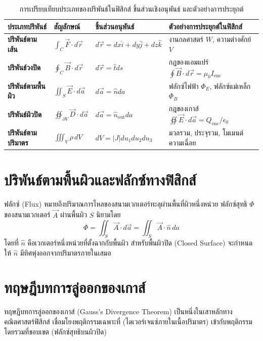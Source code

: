 \begin{table}[htbp]
    \centering
    \caption{การเปรียบเทียบประเภทของปริพันธ์ในฟิสิกส์ ชิ้นส่วนเชิงอนุพันธ์ และตัวอย่างการประยุกต์}
    \label{tab:integral_types_physics}
    \begin{tabularx}{\textwidth}{p{3.0cm}p{2.2cm}p{3.8cm}Y}
        \toprule
        \textbf{ประเภทปริพันธ์} & \textbf{สัญลักษณ์} & \textbf{ชิ้นส่วนอนุพันธ์} & \textbf{ตัวอย่างการประยุกต์ในฟิสิกส์} \\
        \midrule
        \textbf{ปริพันธ์ตามเส้น} & $\int_C \vec{F} \cdot d\vec{r}$ & $d\vec{r} = dx\hat{i}+dy\hat{j}+dz\hat{k}$ & งานกลศาสตร์ $W$, ความต่างศักย์ $V$ \\
        \textbf{ปริพันธ์วงปิด} & $\oint_C \vec{B} \cdot d\vec{r}$ & $d\vec{r} = \hat{t} ds$ & กฎของแอมแปร์ $\oint \vec{B}\cdot d\vec{r} = \mu_0 I_{\text{enc}}$ \\
        \textbf{ปริพันธ์ตามพื้นผิว} & $\iint_S \vec{E} \cdot d\vec{a}$ & $d\vec{a} = \hat{n} da$ & ฟลักซ์ไฟฟ้า $\Phi_E$, ฟลักซ์แม่เหล็ก $\Phi_B$ \\
        \textbf{ปริพันธ์ผิวปิด} & $\oiint_{\partial V} \vec{D} \cdot d\vec{a}$ & $d\vec{a} = \hat{n}_{\text{out}} da$ & กฎของเกาส์ $\oiint \vec{E}\cdot d\vec{a} = Q_{\text{enc}}/\epsilon_0$ \\
        \textbf{ปริพันธ์ตามปริมาตร} & $\iiint_V \rho \, dV$ & $dV = |J|du_1 du_2 du_3$ & มวลรวม, ประจุรวม, โมเมนต์ความเฉื่อย \\
        \bottomrule
    \end{tabularx}
\end{table}

\section{ปริพันธ์ตามพื้นผิวและฟลักซ์ทางฟิสิกส์}
ฟลักซ์ (Flux) หมายถึงปริมาณการไหลของสนามเวกเตอร์ทะลุผ่านพื้นที่ผิวหนึ่งหน่วย ฟลักซ์สุทธิ $\Phi$ ของสนามเวกเตอร์ $\vec{A}$ ผ่านพื้นผิว $S$ นิยามโดย
\begin{equation}
\Phi = \iint_S \vec{A} \cdot d\vec{a} = \iint_S \vec{A} \cdot \hat{n} \, da
\end{equation}
โดยที่ $\hat{n}$ คือเวกเตอร์หนึ่งหน่วยที่ตั้งฉากกับพื้นผิว สำหรับพื้นผิวปิด (Closed Surface) จะกำหนดให้ $\hat{n}$ มีทิศพุ่งออกจากปริมาตรภายในเสมอ

\clearpage
\section{ทฤษฎีบทการลู่ออกของเกาส์}
ทฤษฎีบทการลู่ออกของเกาส์ (Gauss's Divergence Theorem) เป็นหนึ่งในเสาหลักทางคณิตศาสตร์ฟิสิกส์ เชื่อมโยงพฤติกรรมเฉพาะที่ (ไดเวอร์เจนซ์ภายในเนื้อปริมาตร) เข้ากับพฤติกรรมโดยรวมที่ขอบเขต (ฟลักซ์สุทธิบนผิวปิด)

